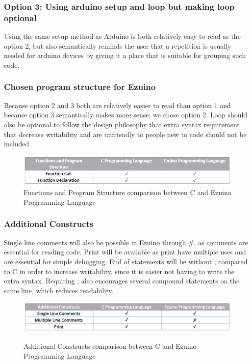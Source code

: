 \subsubsection{Option 3: Using arduino setup and loop but making loop optional}
Using the same setup method as Arduino is both relatively easy to read as the option 2, but also semantically reminds the user that a repetition is usually needed for arduino devices by giving it a place that is suitable for grouping such code.


\subsubsection{Chosen program structure for Ezuino}
Because option 2 and 3 both are relatively easier to read than option 1 and because option 3 semantically makes more sense, we chose option 2. Loop should also be optional to follow the design philosophy that extra syntax requirement that decrease writability and are unfriendly to people new to code should not be included.
\begin{figure}[H]
\centering
\caption{Functions and Program Structure comparison between C and Ezuino Programming Language}
\includegraphics[scale=0.80]{figures/language_features/langf10.png}

\label{lf10}
\end{figure}
\subsubsection*{Additional Constructs}
Single line comments will also be possible in Ezuino through \#, as comments are essential for reading code. Print will be available as print have multiple uses and are essential for simple debugging. End of statements will be without ; compared to C in order to increase writability, since it is easier not having to write the extra syntax. Requiring ; also encourages several compound statements on the same line, which reduces readability.
\begin{figure}[H]
\centering
\caption{Additional Constructs comparison between C and Ezuino Programming Language}
\includegraphics[scale=0.60]{figures/language_features/langf09.png}
\label{lf09}
\end{figure}